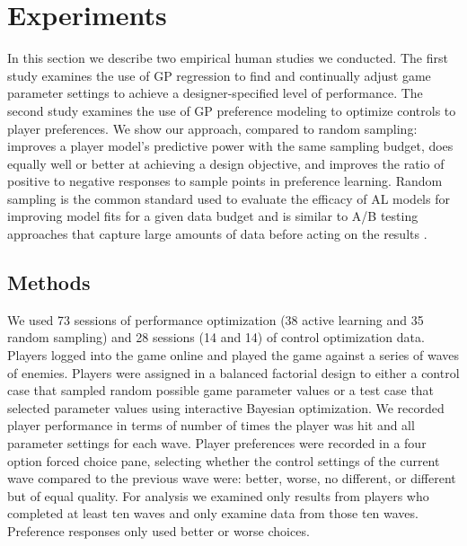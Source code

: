 \documentclass{sig-alternate}
\begin{document}
\section{Experiments}
In this section we describe two empirical human studies we conducted. 
The first study examines the use of GP regression to find and continually adjust game parameter settings to achieve a designer-specified level of performance. 
The second study examines the use of GP preference modeling to optimize controls to player preferences. 
We show our approach, compared to random sampling: improves a player model's predictive power with the same sampling budget, does equally well or better at achieving a design objective, and improves the ratio of positive to negative responses to sample points in preference learning.
Random sampling is the common standard used to evaluate the efficacy of AL models for improving model fits for a given data budget and is similar to A/B testing approaches that capture large amounts of data before acting on the results \cite{settles2012:al-book}.


\subsection{Methods}
We used 73 sessions of performance optimization (38 active learning and 35 random sampling) and 28 sessions (14 and 14) of control optimization data. Players logged into the game online and played the game against a series of waves of enemies. Players were assigned in a balanced factorial design to either a control case that sampled random possible game parameter values or a test case that selected parameter values using interactive Bayesian optimization.
We recorded player performance in terms of number of times the player was hit and all parameter settings for each wave. Player preferences were recorded in a four option forced choice pane, selecting whether the control settings of the current wave compared to the previous wave were: better, worse, no different, or different but of equal quality.
For analysis we examined only results from players who completed at least ten waves and only examine data from those ten waves. Preference responses only used better or worse choices.
\end{document}
